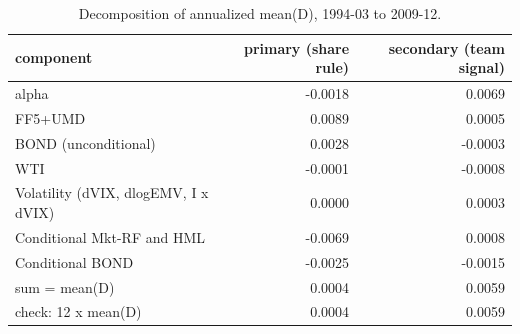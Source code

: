 \begin{table}[htbp]\centering\small
\caption{Decomposition of annualized mean(D), 1994-03 to 2009-12.}
\label{tab:m8_decomposition}
\begin{tabular}{lrr}
\toprule
component & primary (share rule) & secondary (team signal) \\
\midrule
alpha & -0.0018 & 0.0069 \\
FF5+UMD & 0.0089 & 0.0005 \\
BOND (unconditional) & 0.0028 & -0.0003 \\
WTI & -0.0001 & -0.0008 \\
Volatility (dVIX, dlogEMV, I x dVIX) & 0.0000 & 0.0003 \\
Conditional Mkt-RF and HML & -0.0069 & 0.0008 \\
Conditional BOND & -0.0025 & -0.0015 \\
sum = mean(D) & 0.0004 & 0.0059 \\
check: 12 x mean(D) & 0.0004 & 0.0059 \\
\bottomrule
\end{tabular}
\end{table}

